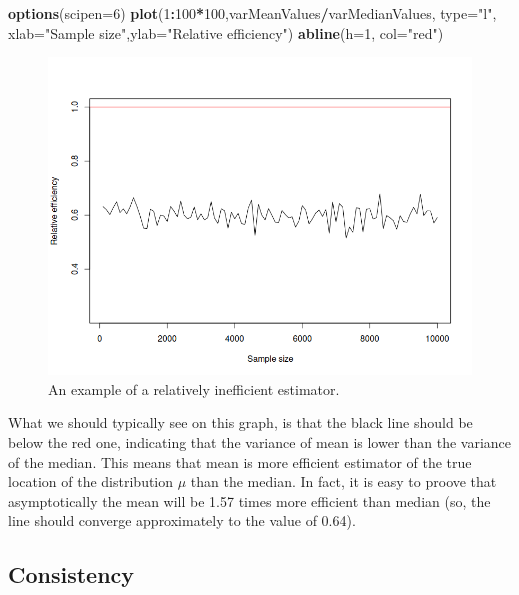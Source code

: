 \documentclass[
]{book}
\newenvironment{Shaded}{\begin{snugshade}}{\end{snugshade}}
\newcommand{\DataTypeTok}[1]{\textcolor[rgb]{0.13,0.29,0.53}{#1}}
\newcommand{\DecValTok}[1]{\textcolor[rgb]{0.00,0.00,0.81}{#1}}
\newcommand{\KeywordTok}[1]{\textcolor[rgb]{0.13,0.29,0.53}{\textbf{#1}}}
\newcommand{\NormalTok}[1]{#1}
\newcommand{\OperatorTok}[1]{\textcolor[rgb]{0.81,0.36,0.00}{\textbf{#1}}}
\newcommand{\StringTok}[1]{\textcolor[rgb]{0.31,0.60,0.02}{#1}}
\theoremstyle{definition}
\theoremstyle{definition}
\theoremstyle{definition}
\theoremstyle{definition}
\theoremstyle{remark}
\begin{document}
\begin{Shaded}
\begin{Highlighting}[]
\KeywordTok{options}\NormalTok{(}\DataTypeTok{scipen=}\DecValTok{6}\NormalTok{)}
\KeywordTok{plot}\NormalTok{(}\DecValTok{1}\OperatorTok{:}\DecValTok{100}\OperatorTok{*}\DecValTok{100}\NormalTok{,varMeanValues}\OperatorTok{/}\NormalTok{varMedianValues, }\DataTypeTok{type=}\StringTok{"l"}\NormalTok{, }\DataTypeTok{xlab=}\StringTok{"Sample size"}\NormalTok{,}\DataTypeTok{ylab=}\StringTok{"Relative efficiency"}\NormalTok{)}
\KeywordTok{abline}\NormalTok{(}\DataTypeTok{h=}\DecValTok{1}\NormalTok{, }\DataTypeTok{col=}\StringTok{"red"}\NormalTok{)}
\end{Highlighting}
\end{Shaded}

\begin{figure}
\centering
\includegraphics{images/02-statistics-efficiency.png}
\caption{\label{fig:statsEfficiecny}An example of a relatively inefficient estimator.}
\end{figure}

What we should typically see on this graph, is that the black line should be below the red one, indicating that the variance of mean is lower than the variance of the median. This means that mean is more efficient estimator of the true location of the distribution \(\mu\) than the median. In fact, it is easy to proove that asymptotically the mean will be 1.57 times more efficient than median \citep{WikipediaMedianEfficiency2020} (so, the line should converge approximately to the value of 0.64).

\hypertarget{estimatesPropertiesConsistency}{%
\subsection{Consistency}\label{estimatesPropertiesConsistency}}
\end{document}
